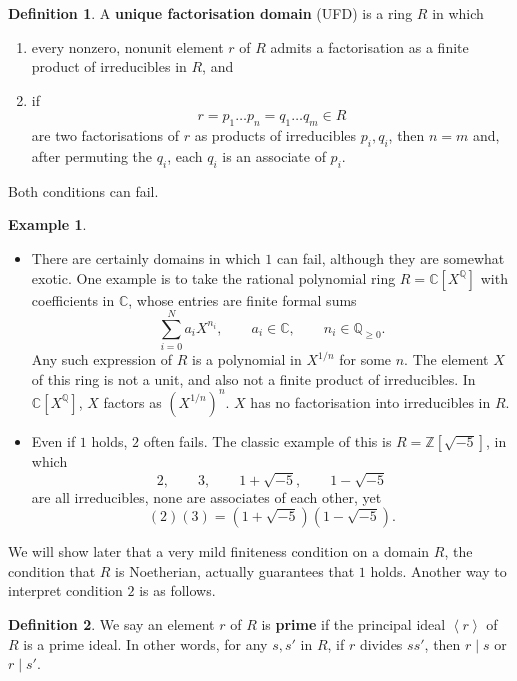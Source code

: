 \documentclass{article}
\newcommand{\Z}{\mathbb{Z}}
\newcommand{\Q}{\mathbb{Q}}
\newcommand{\C}{\mathbb{C}}
\newcommand{\rb}[1]{\left( #1 \right)}
\renewcommand{\sb}[1]{\left[ #1 \right]}
\newcommand{\ab}[1]{\left\langle #1 \right\rangle}
\theoremstyle{definition}\newtheorem{definition}{Definition}[subsection]
\theoremstyle{definition}\newtheorem{remark}[definition]{Remark}
\theoremstyle{definition}\newtheorem*{example}{Example}
\theoremstyle{definition}\newtheorem*{note}{Note}
\begin{document}
\begin{definition}
A \textbf{unique factorisation domain} (UFD) is a ring $ R $ in which
\begin{enumerate}
\item every nonzero, nonunit element $ r $ of $ R $ admits a factorisation as a finite product of irreducibles in $ R $, and
\item if
$$ r = p_1 \dots p_n = q_1 \dots q_m \in R $$
are two factorisations of $ r $ as products of irreducibles $ p_i, q_i $, then $ n = m $ and, after permuting the $ q_i $, each $ q_i $ is an associate of $ p_i $.
\end{enumerate}
\end{definition}

Both conditions can fail.

\begin{example}
\hfill
\begin{itemize}
\item There are certainly domains in which $ 1 $ can fail, although they are somewhat exotic. One example is to take the rational polynomial ring $ R = \C\sb{X^\Q} $ with coefficients in $ \C $, whose entries are finite formal sums
$$ \sum_{i = 0}^N a_iX^{n_i}, \qquad a_i \in \C, \qquad n_i \in \Q_{\ge 0}. $$
Any such expression of $ R $ is a polynomial in $ X^{1 / n} $ for some $ n $. The element $ X $ of this ring is not a unit, and also not a finite product of irreducibles. In $ \C\sb{X^\Q} $, $ X $ factors as $ \rb{X^{1 / n}}^n $. $ X $ has no factorisation into irreducibles in $ R $.
\item Even if $ 1 $ holds, $ 2 $ often fails. The classic example of this is $ R = \Z\sb{\sqrt{-5}} $, in which
$$ 2, \qquad 3, \qquad 1 + \sqrt{-5}, \qquad 1 - \sqrt{-5} $$
are all irreducibles, none are associates of each other, yet
$$ \rb{2}\rb{3} = \rb{1 + \sqrt{-5}}\rb{1 - \sqrt{-5}}. $$
\end{itemize}
\end{example}

We will show later that a very mild finiteness condition on a domain $ R $, the condition that $ R $ is Noetherian, actually guarantees that $ 1 $ holds. Another way to interpret condition $ 2 $ is as follows.

\begin{definition}
We say an element $ r $ of $ R $ is \textbf{prime} if the principal ideal $ \ab{r} $ of $ R $ is a prime ideal. In other words, for any $ s, s' $ in $ R $, if $ r $ divides $ ss' $, then $ r \mid s $ or $ r \mid s' $.
\end{definition}
\end{document}
